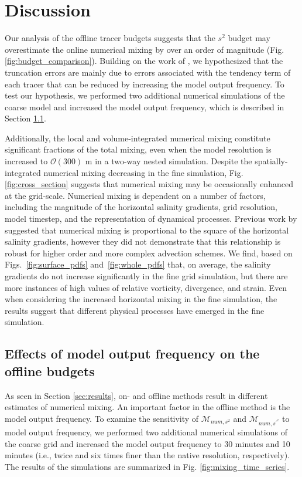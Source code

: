 \documentclass[draft]{agujournal2019}
\begin{document}
\section{Discussion} \label{sec:discussion}

Our analysis of the offline tracer budgets suggests that the $s^2$ budget may overestimate the online numerical mixing by over an order of magnitude (Fig. \ref{fig:budget_comparison}). Building on the work of , we hypothesized that the truncation errors are mainly due to errors associated with the tendency term of each tracer that can be reduced by increasing the model output frequency. To test our hypothesis, we performed two additional numerical simulations of the coarse model and increased the model output frequency, which is described in Section \ref{sec:model_output_frequency}.

Additionally, the local and volume-integrated numerical mixing constitute significant fractions of the total mixing, even when the model resolution is increased to $\mathcal{O}(300)$ m in a two-way nested simulation. Despite the spatially-integrated numerical mixing decreasing in the fine simulation, Fig. \ref{fig:cross_section} suggests that numerical mixing may be occasionally enhanced at the grid-scale. Numerical mixing is dependent on a number of factors, including the magnitude of the horizontal salinity gradients, grid resolution, model timestep, and the representation of dynamical processes. Previous work by  suggested that numerical mixing is proportional to the square of the horizontal salinity gradients, however they did not demonstrate that this relationship is robust for higher order and more complex advection schemes. We find, based on Figs.~\ref{fig:surface_pdfs} and~\ref{fig:whole_pdfs} that, on average, the salinity gradients do not increase significantly in the fine grid simulation, but there are more instances of high values of relative vorticity, divergence, and strain. Even when considering the increased horizontal mixing in the fine simulation, the results suggest that different physical processes have emerged in the fine simulation.

\subsection{Effects of model output frequency on the offline budgets} \label{sec:model_output_frequency}

As seen in Section \ref{sec:results}, on- and offline methods result in different estimates of numerical mixing. An important factor in the offline method is the model output frequency. To examine the sensitivity of $\mathcal{M}_{num, s^2}$ and $\mathcal{M}_{num, s^{\prime^2}}$ to model output frequency, we performed two additional numerical simulations of the coarse grid and increased the model output frequency to 30 minutes and 10 minutes (i.e., twice and six times finer than the native resolution, respectively). The results of the simulations are summarized in Fig. \ref{fig:mixing_time_series}.
\end{document}
